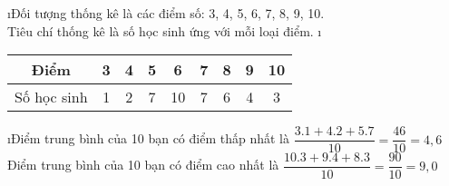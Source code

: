 \begin{Answer}{8}
		\begin{enumerate}[a),leftmargin=*]
			\i Đối tượng thống kê là các điểm số: 3, 4, 5, 6, 7, 8, 9, 10.\\
			 Tiêu chí thống kê là số học sinh ứng với mỗi loại điểm.
			\i \begin{tabular}{|c|c|c|c|c|c|c|c|c|}
				\hline
					Điểm&	3&	4	&5&	6&	7&	8&	9&	10\\
					\hline
				Số học sinh&	1&	2&	7&	10&	7&	6	&4&	3\\
				\hline
			\end{tabular}
		
			\i Điểm trung bình của 10 bạn có điểm thấp nhất là  $\dfrac{{3.1 + 4.2 + 5.7}}{{10}} = \dfrac{{46}}{{10}} = 4,6$\\
			Điểm trung bình của 10 bạn có điểm cao nhất là  $\dfrac{{10.3 + 9.4 + 8.3}}{{10}} = \dfrac{{90}}{{10}} = 9,0$
		\end{enumerate}
	
\end{Answer}
